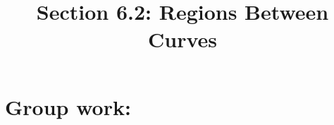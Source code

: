 \documentclass[noinstructornotes]{ximera}
\title{Section 6.2: Regions Between Curves}
\begin{document}
\begin{abstract}		\end{abstract}
\maketitle

\section{Group work:}
\end{document}

